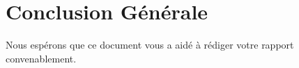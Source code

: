 \chapter*{Conclusion Générale}

Nous espérons que ce document vous a aidé à rédiger votre rapport convenablement.